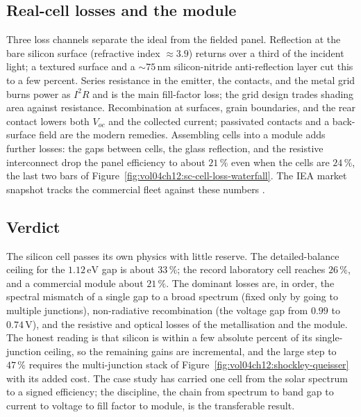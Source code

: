 \subsection{Real-cell losses and the module}

Three loss channels separate the ideal from the fielded panel.
Reflection at the bare silicon surface (refractive index $\approx 3.9$)
returns over a third of the incident light; a textured surface and a
$\sim 75\,\si{\nano\meter}$ silicon-nitride anti-reflection layer cut
this to a few percent. Series resistance in the emitter, the contacts,
and the metal grid burns power as $I^{2}R$ and is the main fill-factor
loss; the grid design trades shading area against resistance.
Recombination at surfaces, grain boundaries, and the rear contact
lowers both $V_{oc}$ and the collected current; passivated contacts and
a back-surface field are the modern remedies. Assembling cells into a
module adds further losses: the gaps between cells, the glass
reflection, and the resistive interconnect drop the panel efficiency to
about $21\,\%$ even when the cells are $24\,\%$, the last two bars of
Figure~\ref{fig:vol04ch12:sc-cell-loss-waterfall}. The IEA market
snapshot tracks the commercial fleet against these numbers
\cite{data:ch09t3-iea-pv-2023}.

\subsection{Verdict}

The silicon cell passes its own physics with little reserve. The
detailed-balance ceiling for the $1.12\,\si{\electronvolt}$ gap is
about $33\,\%$; the record laboratory cell reaches $26\,\%$, and a
commercial module about $21\,\%$. The dominant losses are, in order,
the spectral mismatch of a single gap to a broad spectrum (fixed only
by going to multiple junctions), non-radiative recombination (the
voltage gap from $0.99$ to $0.74\,\si{\volt}$), and the resistive and
optical losses of the metallisation and the module. The honest reading
is that silicon is within a few absolute percent of its single-junction
ceiling, so the remaining gains are incremental, and the large step to
$47\,\%$ requires the multi-junction stack of
Figure~\ref{fig:vol04ch12:shockley-queisser} with its added cost. The
case study has carried one cell from the solar spectrum to a signed
efficiency; the discipline, the chain from spectrum to band gap to
current to voltage to fill factor to module, is the transferable
result.

